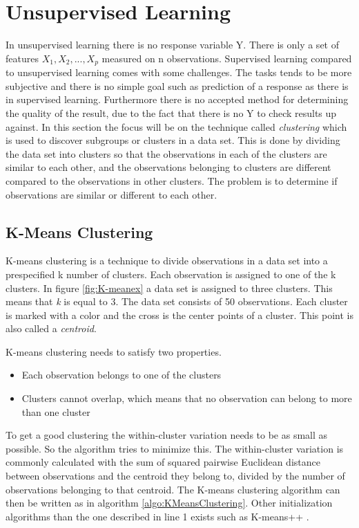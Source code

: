 \chapter{Unsupervised Learning}
\label{chp:unsuplea}
In unsupervised learning there is no response variable Y. There is only a set of features $X_1, X_2,..., X_p$ measured on n observations. 
Supervised learning compared to unsupervised learning comes with some challenges. The tasks tends to be more subjective and there is no simple goal such as prediction of a response as there is in supervised learning. Furthermore there is no accepted method for determining the quality of the result, due to the fact that there is no Y to check results up against.
In this section the focus will be on the  technique called \emph{clustering} which is used to discover subgroups or clusters in a data set. 
This is done by dividing the data set into clusters so that the observations in each of the clusters are similar to each other, and the observations belonging to clusters are different compared to the observations in other clusters.
The problem is to determine if observations are similar or different to each other.
 
\section{K-Means Clustering}
\label{chp:clus}
K-means clustering is a technique to divide observations in a data set into a prespecified k number of clusters. Each observation is assigned to one of the k clusters. In figure \ref{fig:K-meanex} a data set is assigned to three clusters. This means that \emph{k} is equal to 3. The data set consists of 50 observations. Each cluster is marked with a color and the cross is the center points of a cluster. This point is also called a \emph{centroid}.


K-means clustering needs to satisfy two properties. 
\begin{itemize}
	\item Each observation belongs to one of the clusters
	\item Clusters cannot overlap, which means that no observation can belong to more than one cluster
\end{itemize} 

To get a good clustering the within-cluster variation needs to be as small as possible. So the algorithm tries to minimize this. The within-cluster variation is commonly calculated with the sum of squared pairwise Euclidean distance between observations and the centroid they belong to, divided by the number of observations belonging to that centroid. 
The K-means clustering algorithm can then be written as in algorithm \ref{algo:KMeansClustering}. Other initialization algorithms than the one described in line 1 exists such as K-means++ \citep{kplusplus}.

